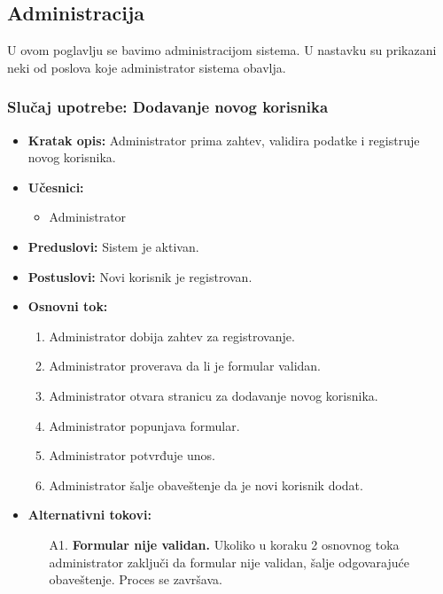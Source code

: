 \documentclass[titlepage]{article}
\begin{document}
\subsection{Administracija}

U ovom poglavlju se bavimo administracijom sistema. U nastavku su prikazani neki od poslova koje administrator sistema obavlja.

\subsubsection{Slučaj upotrebe: Dodavanje novog korisnika}

\begin{itemize}
    \item \textbf{Kratak opis:} Administrator prima zahtev, validira podatke i registruje novog korisnika.
    \item \textbf{Učesnici:}
        \begin{itemize}
            \item Administrator
        \end{itemize}
    \item \textbf{Preduslovi:} Sistem je aktivan.
    \item \textbf{Postuslovi:} Novi korisnik je registrovan.
    \item \textbf{Osnovni tok:}
        \begin{enumerate}
            \item Administrator dobija zahtev za registrovanje.
            \item Administrator proverava da li je formular validan.
            \item Administrator otvara stranicu za dodavanje novog korisnika.
            \item Administrator popunjava formular.
            \item Administrator potvrđuje unos.
            \item Administrator šalje obaveštenje da je novi korisnik dodat.
        \end{enumerate}  
    
    \item \textbf{Alternativni tokovi:}
        \begin{itemize}
            \item[A1.] \textbf{Formular nije validan.} Ukoliko u koraku 2 osnovnog toka administrator zaključi da formular nije validan, šalje odgovarajuće obaveštenje. Proces se završava.
        \end{itemize}
\end{itemize}
\end{document}
